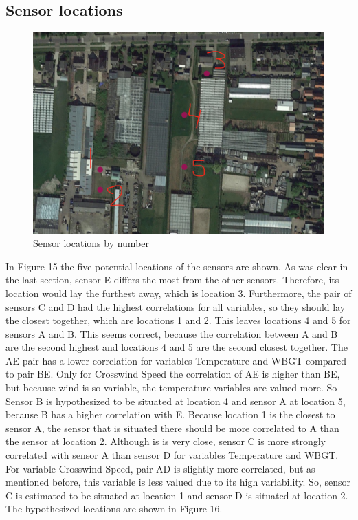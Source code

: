 \documentclass{article}
\begin{document}
    \subsection{Sensor locations} 
        \begin{figure}[H]
            \includegraphics[width=\textwidth]{sensor_locations.png}
            \caption{Sensor locations by number}
        \end{figure}

        In Figure 15 the five potential locations of the sensors are shown. As was clear in the
        last section, sensor E differs the most from the other sensors. Therefore, its location 
        would lay the furthest away, which is location 3. Furthermore, the pair of 
        sensors C and D had the highest correlations for all variables, so they should lay the closest 
        together, which are locations 1 and 2. This leaves locations 4 and 5 for sensors A and B. This
        seems correct, because the correlation between A and B are the second highest and locations 4 and 
        5 are the second closest together. The AE pair has a lower correlation for variables Temperature 
        and WBGT compared to pair BE. Only for Crosswind Speed the correlation of AE is higher than 
        BE, but because wind is so variable, the temperature variables are valued more. So Sensor B
        is hypothesized to be situated at location 4 and sensor A at location 5, because B has a higher 
        correlation with E. Because location 1
        is the closest to sensor A, the sensor that is situated there should be more correlated to A
        than the sensor at location 2. Although is is very close, sensor C is more strongly correlated
        with sensor A than sensor D for variables Temperature and WBGT. For variable Crosswind Speed,
        pair AD is slightly more correlated, but as mentioned before, this variable is less valued 
        due to its high variability. So, sensor C is estimated to be situated at location 1 and 
        sensor D is situated at location 2. The hypothesized locations are shown in Figure 16.
\end{document}
